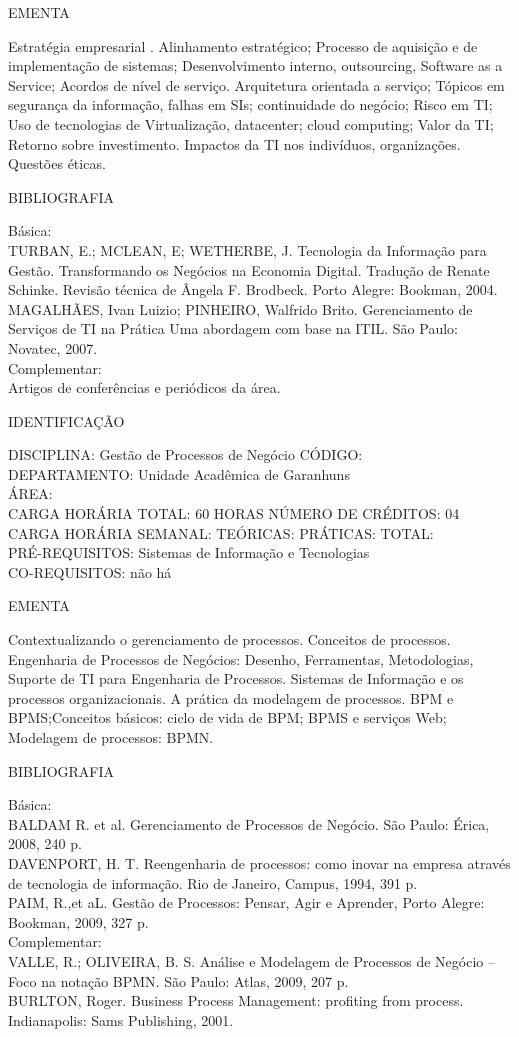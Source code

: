 \documentclass[
	12pt,				%
	openright,			%
  oneside,     %
	a4paper,			%
	chapter=TITLE,		%
	english,			%
	french,				%
	spanish,			%
	brazil				%
	]{abntex2}
\begin{document}
\begin{apendicesenv}
EMENTA 

Estratégia empresarial . Alinhamento estratégico; Processo de aquisição
e de implementação de sistemas; Desenvolvimento interno, outsourcing,
Software as a Service; Acordos de nível de serviço. Arquitetura
orientada a serviço; Tópicos em segurança da informação, falhas em SIs;
continuidade do negócio; Risco em TI; Uso de tecnologias de
Virtualização, datacenter; cloud computing; Valor da TI; Retorno sobre
investimento. Impactos da TI nos indivíduos, organizações. Questões
éticas.

BIBLIOGRAFIA 

Básica:\\
TURBAN, E.; MCLEAN, E; WETHERBE, J. Tecnologia da Informação para
Gestão. Transformando os Negócios na Economia Digital. Tradução de
Renate Schinke. Revisão técnica de Ângela F. Brodbeck. Porto Alegre:
Bookman, 2004.\\
MAGALHÃES, Ivan Luizio; PINHEIRO, Walfrido Brito. Gerenciamento de
Serviços de TI na Prática  Uma abordagem com base na ITIL. São
Paulo: Novatec, 2007.\\
Complementar:\\
Artigos de conferências e periódicos da área.

\newpage IDENTIFICAÇÃO

DISCIPLINA: Gestão de Processos de Negócio CÓDIGO:\\ 
DEPARTAMENTO: Unidade Acadêmica de Garanhuns\\
ÁREA: \\
CARGA HORÁRIA TOTAL: 60 HORAS NÚMERO DE CRÉDITOS: 04\\
CARGA HORÁRIA SEMANAL: TEÓRICAS: PRÁTICAS: TOTAL: \\
PRÉ-REQUISITOS: Sistemas de Informação e Tecnologias\\
CO-REQUISITOS: não há

EMENTA 

Contextualizando o gerenciamento de processos. Conceitos de processos.
Engenharia de Processos de Negócios: Desenho, Ferramentas,
Metodologias, Suporte de TI para Engenharia de Processos. Sistemas de
Informação e os processos organizacionais. A prática da modelagem de
processos. BPM e BPMS;Conceitos básicos: ciclo de vida de BPM; BPMS e
serviços Web; Modelagem de processos: BPMN.

BIBLIOGRAFIA 

Básica:\\
BALDAM R. et al. Gerenciamento de Processos de Negócio. São Paulo:
Érica, 2008, 240 p.\\
DAVENPORT, H. T. Reengenharia de processos: como inovar na empresa
através de tecnologia de informação. Rio de Janeiro, Campus, 1994, 391
p.\\
PAIM, R.,et aL. Gestão de Processos: Pensar, Agir e Aprender, Porto
Alegre: Bookman, 2009, 327 p.\\
Complementar:\\
VALLE, R.; OLIVEIRA, B. S. Análise e Modelagem de Processos de Negócio
-- Foco na notação BPMN. São Paulo: Atlas, 2009, 207 p.\\
BURLTON, Roger. Business Process Management: profiting from process.
Indianapolis: Sams Publishing, 2001.


\end{apendicesenv}
\end{document}
